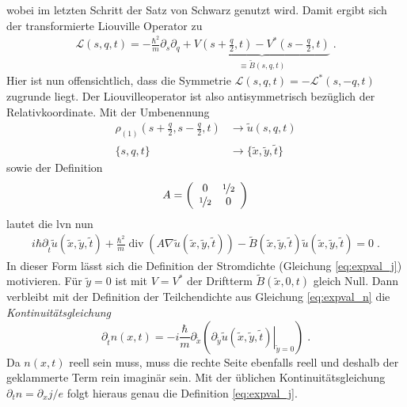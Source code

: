 wobei im letzten Schritt der Satz von Schwarz genutzt wird. Damit ergibt sich der transformierte Liouville Operator zu
\begin{align}
  \mathcal{L}(s,q,t) = -\frac{\hbar^2}{m} \partial_s\partial_q + \underbrace{V\left(s+\frac{q}{2},t\right) - V^*\left(s-\frac{q}{2},t\right)}_{\equiv \tilde{B}(s,q,t)} \; .
  \label{eq:Liouvilleoperator}
\end{align}
Hier ist nun offensichtlich, dass die Symmetrie $\mathcal{L}(s,q,t)=-\mathcal{L}^*(s,-q,t)$ zugrunde liegt. Der Liouvilleoperator ist also antisymmetrisch bezüglich der Relativkoordinate. Mit der Umbenennung
\begin{equation}
  \label{eq:Umbenennung}
\begin{aligned}
  \rho_{(1)}\left(s+\frac{q}{2}, s-\frac{q}{2}, t\right) &\longrightarrow \tilde{u}(s,q,t) \\
  \{ s, q, t\} &\longrightarrow \{\tilde{x}, \tilde{y}, \tilde{t}\}
\end{aligned}
\end{equation}
sowie der Definition
\begin{align*}
  A = \left(\begin{array}{c c} 0 & \nicefrac{1}{2} \\ \nicefrac{1}{2} & 0 \end{array} \right)
\end{align*}
lautet die \ac{lvn} nun
\begin{align*}
  i\hbar\partial_{\tilde{t}} \tilde{u}(\tilde{x},\tilde{y},\tilde{t})+\frac{\hbar^2}{m}\operatorname{div}(A\nabla \tilde{u}(\tilde{x},\tilde{y},\tilde{t})) -  \tilde{B}(\tilde{x},\tilde{y},\tilde{t}) \tilde{u}(\tilde{x},\tilde{y},\tilde{t}) = 0 \; .
\end{align*}
In dieser Form lässt sich die Definition der Stromdichte (Gleichung \eqref{eq:expval_j}) motivieren. Für $\tilde{y}=0$ ist mit $V=V^*$ der Driftterm $\tilde{B}(\tilde{x},0,t)$ gleich Null. Dann verbleibt mit der Definition der Teilchendichte aus Gleichung \eqref{eq:expval_n} die \emph{Kontinuitätsgleichung}
\begin{equation}
  \partial_{\tilde{t}}n(x,t) = -i\frac{\hbar}{m} \partial_{\tilde{x}} (\left. \partial_{\tilde{y}}\tilde{u}(\tilde{x},\tilde{y},\tilde{t})\right\rvert_{\tilde{y}=0}) \; .
\end{equation}
Da $n(x,t)$ reell sein muss, muss die rechte Seite ebenfalls reell und deshalb der geklammerte Term rein imaginär sein. Mit der üblichen Kontinuitätsgleichung $\partial_t n = \partial_x j / e$ folgt hieraus genau die Definition \eqref{eq:expval_j}.

